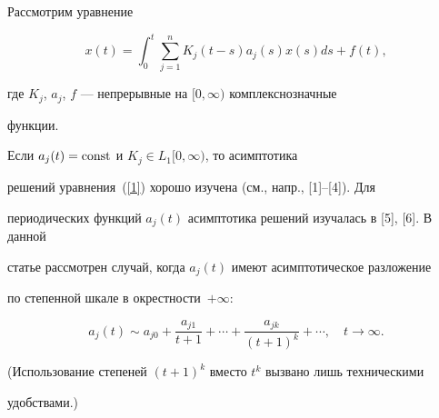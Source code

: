 \pagestyle{plain} %







\maketitle


\label{begin}








Рассмотрим уравнение


\begin{equation}


\label{1}


x (t)=\int_0^t \sum\limits_{j=1}^{n} K_j(t-s) a_j(s)


x(s) ds+f(t),


\end{equation}


где $K_j$, $a_j$, $f$ --- непрерывные на $[0,\infty)$ комплекснозначные 


функции.





Если $a_j(t)=\operatorname{const}$ и $K_j \in L_1[0,\infty)$, то асимптотика


решений уравнения~(\ref{1}) хорошо изучена (см., напр., [1]--[4]). Для 


периодических функций $a_j(t)$ асимптотика решений изучалась в [5], [6]. В данной


статье рассмотрен случай, когда $a_j(t)$ имеют асимптотическое разложение 


по степенной шкале в окрестности~$+\infty$:


\begin{equation}


\label{2}


a_j(t)\sim a_{j0}+\frac{a_{j1} }{{t+1}}+\dotsb+\frac{{a_{jk}}}{{(t+1)^k }}+


\dotsb,\quad t \to \infty.


\end{equation}


(Использование степеней $(t+1)^k$ вместо $t^k$ вызвано лишь техническими


удобствами.)





